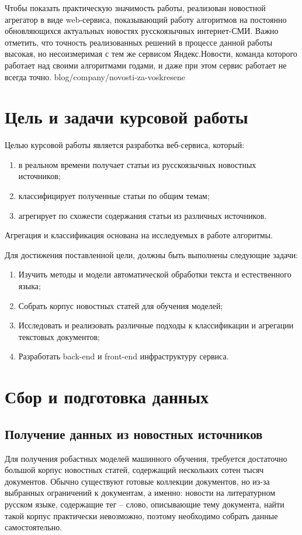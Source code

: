 \documentclass[a4paper, 14pt]{extarticle}
\begin{document}
Чтобы показать практическую значимость работы, реализован новостной агрегатор в виде web-сервиса, показывающий работу 
алгоритмов на постоянно обновляющихся актуальных новостях русскоязычных интернет-СМИ. Важно отметить, что точность 
реализованных решений в процессе данной работы высокая, но несоизмеримая с тем же сервисом Яндекс.Новости, команда 
которого работает над своими алгоритмами годами, и даже при этом сервис работает не всегда точно. %
blog/company/novosti-za-voskresene

\section{Цель и задачи курсовой работы}
Целью курсовой работы является разработка веб-сервиса, который:
\begin{enumerate}
	\item в реальном времени получает статьи из русскоязычных новостных источников;
	\item классифицирует полученные статьи по общим темам;
	\item агрегирует по схожести содержания статьи из различных источников.
\end{enumerate}
Агрегация и классификация основана на исследуемых в работе алгоритмы.

Для достижения поставленной цели, должны быть выполнены следующие задачи:
\begin{enumerate}
	\item Изучить методы и модели автоматической обработки текста и естественного языка;
	\item Собрать корпус новостных статей для обучения моделей;
	\item Исследовать и реализовать различные подходы к классификации и агрегации текстовых документов;
	\item Разработать back-end и front-end инфраструктуру сервиса.
\end{enumerate}

\section{Сбор и подготовка данных}
\subsection{Получение данных из новостных источников}
Для получения робастных моделей машинного обучения, требуется достаточно большой корпус новостных статей,
содержащий нескольких сотен тысяч документов. Обычно существуют готовые коллекции документов, но из-за выбранных 
ограничений к документам, а именно: новости на литературном русском языке, содержащие тег -- слово, описывающие тему 
документа, найти такой корпус практически невозможно, поэтому необходимо собрать данные самостоятельно.
\end{document}
